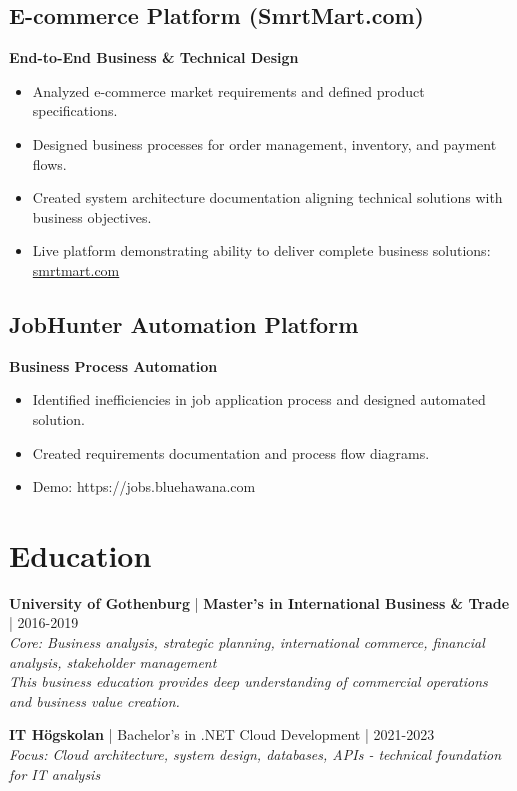 \documentclass[10pt,a4paper]{article}
\begin{document}
\subsection*{E-commerce Platform (SmrtMart.com)}
\textbf{End-to-End Business \& Technical Design}
\begin{itemize}[noitemsep]
\item Analyzed e-commerce market requirements and defined product specifications.
\item Designed business processes for order management, inventory, and payment flows.
\item Created system architecture documentation aligning technical solutions with business objectives.
\item Live platform demonstrating ability to deliver complete business solutions: \href{https://www.smrtmart.com}{smrtmart.com}
\end{itemize}

\subsection*{JobHunter Automation Platform}
\textbf{Business Process Automation}
\begin{itemize}[noitemsep]
\item Identified inefficiencies in job application process and designed automated solution.
\item Created requirements documentation and process flow diagrams.
\item Demo: https://jobs.bluehawana.com
\end{itemize}

\section*{Education}

\textbf{University of Gothenburg} | \textbf{Master's in International Business \& Trade} | 2016-2019\\
\textit{Core: Business analysis, strategic planning, international commerce, financial analysis, stakeholder management}\\
\textit{This business education provides deep understanding of commercial operations and business value creation.}

\textbf{IT Högskolan} | Bachelor's in .NET Cloud Development | 2021-2023\\
\textit{Focus: Cloud architecture, system design, databases, APIs - technical foundation for IT analysis}
\end{document}
